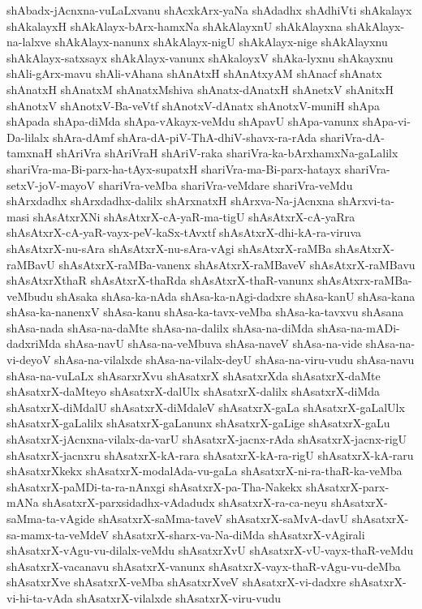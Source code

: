 {shAbadx-jAcnxna-vuLaLxvanu
shAcxkArx-yaNa
shAdadhx
shAdhiVti
shAkalayx
shAkalayxH
shAkAlayx-bArx-hamxNa
shAkAlayxnU
shAkAlayxna
shAkAlayx-na-lalxve
shAkAlayx-nanunx
shAkAlayx-nigU
shAkAlayx-nige
shAkAlayxnu
shAkAlayx-satxsayx
shAkAlayx-vanunx
shAkaloyxV
shAka-lyxnu
shAkayxnu
shAli-gArx-mavu
shAli-vAhana
shAnAtxH
shAnAtxyAM
shAnacf
shAnatx
shAnatxH
shAnatxM
shAnatxMshiva
shAnatx-dAnatxH
shAnetxV
shAnitxH
shAnotxV
shAnotxV-Ba-veVtf
shAnotxV-dAnatx
shAnotxV-muniH
shApa
shApada
shApa-diMda
shApa-vAkayx-veMdu
shApavU
shApa-vanunx
shApa-vi-Da-lilalx
shAra-dAmf
shAra-dA-piV-ThA-dhiV-shavx-ra-rAda
shariVra-dA-tamxnaH
shAriVra
shAriVraH
shAriV-raka
shariVra-ka-bArxhamxNa-gaLalilx
shariVra-ma-Bi-parx-ha-tAyx-supatxH
shariVra-ma-Bi-parx-hatayx
shariVra-setxV-joV-mayoV
shariVra-veMba
shariVra-veMdare
shariVra-veMdu
shArxdadhx
shArxdadhx-dalilx
shArxnatxH
shArxva-Na-jAcnxna
shArxvi-ta-masi
shAsAtxrXNi
shAsAtxrX-cA-yaR-ma-tigU
shAsAtxrX-cA-yaRra
shAsAtxrX-cA-yaR-vayx-peV-kaSx-tAvxtf
shAsAtxrX-dhi-kA-ra-viruva
shAsAtxrX-nu-sAra
shAsAtxrX-nu-sAra-vAgi
shAsAtxrX-raMBa
shAsAtxrX-raMBavU
shAsAtxrX-raMBa-vanenx
shAsAtxrX-raMBaveV
shAsAtxrX-raMBavu
shAsAtxrXthaR
shAsAtxrX-thaRda
shAsAtxrX-thaR-vanunx
shAsAtxrx-raMBa-veMbudu
shAsaka
shAsa-ka-nAda
shAsa-ka-nAgi-dadxre
shAsa-kanU
shAsa-kana
shAsa-ka-nanenxV
shAsa-kanu
shAsa-ka-tavx-veMba
shAsa-ka-tavxvu
shAsana
shAsa-nada
shAsa-na-daMte
shAsa-na-dalilx
shAsa-na-diMda
shAsa-na-mADi-dadxriMda
shAsa-navU
shAsa-na-veMbuva
shAsa-naveV
shAsa-na-vide
shAsa-na-vi-deyoV
shAsa-na-vilalxde
shAsa-na-vilalx-deyU
shAsa-na-viru-vudu
shAsa-navu
shAsa-na-vuLaLx
shAsarxrXvu
shAsatxrX
shAsatxrXda
shAsatxrX-daMte
shAsatxrX-daMteyo
shAsatxrX-dalUlx
shAsatxrX-dalilx
shAsatxrX-diMda
shAsatxrX-diMdalU
shAsatxrX-diMdaleV
shAsatxrX-gaLa
shAsatxrX-gaLalUlx
shAsatxrX-gaLalilx
shAsatxrX-gaLanunx
shAsatxrX-gaLige
shAsatxrX-gaLu
shAsatxrX-jAcnxna-vilalx-da-varU
shAsatxrX-jacnx-rAda
shAsatxrX-jacnx-rigU
shAsatxrX-jacnxru
shAsatxrX-kA-rara
shAsatxrX-kA-ra-rigU
shAsatxrX-kA-raru
shAsatxrXkekx
shAsatxrX-modalAda-vu-gaLa
shAsatxrX-ni-ra-thaR-ka-veMba
shAsatxrX-paMDi-ta-ra-nAnxgi
shAsatxrX-pa-Tha-Nakekx
shAsatxrX-parx-mANa
shAsatxrX-parxsidadhx-vAdadudx
shAsatxrX-ra-ca-neyu
shAsatxrX-saMma-ta-vAgide
shAsatxrX-saMma-taveV
shAsatxrX-saMvA-davU
shAsatxrX-sa-mamx-ta-veMdeV
shAsatxrX-sharx-va-Na-diMda
shAsatxrX-vAgirali
shAsatxrX-vAgu-vu-dilalx-veMdu
shAsatxrXvU
shAsatxrX-vU-vayx-thaR-veMdu
shAsatxrX-vacanavu
shAsatxrX-vanunx
shAsatxrX-vayx-thaR-vAgu-vu-deMba
shAsatxrXve
shAsatxrX-veMba
shAsatxrXveV
shAsatxrX-vi-dadxre
shAsatxrX-vi-hi-ta-vAda
shAsatxrX-vilalxde
shAsatxrX-viru-vudu
}
